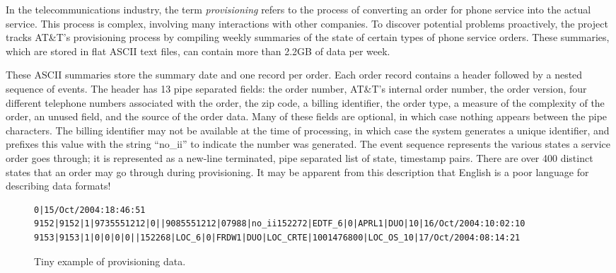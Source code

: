 In the telecommunications industry, the term \textit{provisioning} refers to
the process of converting an order for phone service into the
actual service.  This process is complex, involving many interactions
with other companies.  To discover potential problems proactively, the \dibbler{}
project tracks AT\&T's provisioning process by compiling weekly
summaries of the state of certain types of phone service orders.
These summaries, which are stored in flat ASCII text files, can
contain more than 2.2GB of data per week.

These ASCII summaries store the summary date
and one record per order.  Each order record contains a header
followed by a nested sequence of events.  The header has 13 pipe
separated fields: the order number, AT\&T's internal order number, the
order version, four different telephone numbers associated with the
order, the zip code, a billing identifier, the order
type, a measure of the complexity of the order, an unused field, and
the source of the order data.  Many of these fields are optional, in
which case nothing appears between the pipe characters.  The billing
identifier may not be available at the time of processing, in which
case the system generates a unique identifier, and prefixes this value
with the string ``no\_ii'' to indicate the number was generated. The
event sequence represents the various states a service order goes
through; it is represented as a new-line terminated, pipe separated
list of state, timestamp pairs.  There are over 400 distinct states
that an order may go through during provisioning.  It may be apparent from
this description that English is a poor language for describing data
formats!

\begin{figure*}
\begin{small}
\begin{center}
\begin{verbatim}
0|15/Oct/2004:18:46:51
9152|9152|1|9735551212|0||9085551212|07988|no_ii152272|EDTF_6|0|APRL1|DUO|10|16/Oct/2004:10:02:10
9153|9153|1|0|0|0|0||152268|LOC_6|0|FRDW1|DUO|LOC_CRTE|1001476800|LOC_OS_10|17/Oct/2004:08:14:21
\end{verbatim}
\caption{Tiny example of \dibbler{} provisioning data.}
\label{figure:dibbler-records}
\end{center}
\end{small}
\end{figure*}

